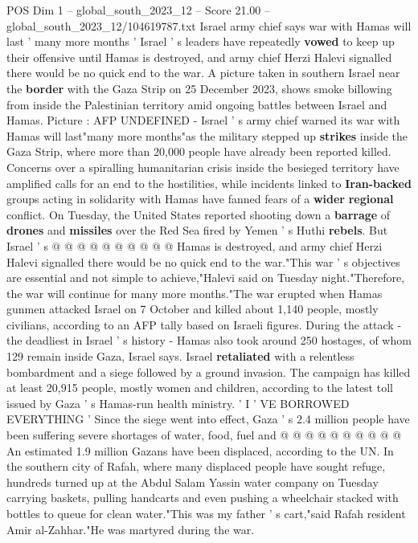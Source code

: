 \begin{textsample}{POS Dim 1 – global\_south\_2023\_12 – Score 21.00 – global\_south\_2023\_12/104619787.txt}  \label{ex:f1_pos_162}
Israel army chief says war with Hamas will last ' many more months ' Israel ' s leaders have repeatedly \textbf{vowed} to keep up their offensive until Hamas is destroyed, and army chief Herzi Halevi signalled there would be no quick end to the war.
A picture taken in southern Israel near the \textbf{border} with the Gaza Strip on 25 December 2023, shows smoke billowing from inside the Palestinian territory amid ongoing battles between Israel and Hamas.
Picture : AFP UNDEFINED - Israel ' s army chief warned its war with Hamas will last"many more months"as the military stepped up \textbf{strikes} inside the Gaza Strip, where more than 20,000 people have already been reported killed.
Concerns over a spiralling humanitarian crisis inside the besieged territory have amplified calls for an end to the hostilities, while incidents linked to \textbf{Iran-backed} groups acting in solidarity with Hamas have fanned fears of a \textbf{wider} \textbf{regional} conflict.
On Tuesday, the United States reported shooting down a \textbf{barrage} of \textbf{drones} and \textbf{missiles} over the Red Sea fired by Yemen ' s Huthi \textbf{rebels}.
But Israel ' s @ @ @ @ @ @ @ @ @ @ Hamas is destroyed, and army chief Herzi Halevi signalled there would be no quick end to the war."This war ' s objectives are essential and not simple to achieve,"Halevi said on Tuesday night."Therefore, the war will continue for many more months."The war erupted when Hamas gunmen attacked Israel on 7 October and killed about 1,140 people, mostly civilians, according to an AFP tally based on Israeli figures.
During the attack - the deadliest in Israel ' s history - Hamas also took around 250 hostages, of whom 129 remain inside Gaza, Israel says.
Israel \textbf{retaliated} with a relentless bombardment and a siege followed by a ground invasion.
The campaign has killed at least 20,915 people, mostly women and children, according to the latest toll issued by Gaza ' s Hamas-run health ministry. ' I ' VE BORROWED EVERYTHING ' Since the siege went into effect, Gaza ' s 2.4 million people have been suffering severe shortages of water, food, fuel and @ @ @ @ @ @ @ @ @ @ An estimated 1.9 million Gazans have been displaced, according to the UN.
In the southern city of Rafah, where many displaced people have sought refuge, hundreds turned up at the Abdul Salam Yassin water company on Tuesday carrying baskets, pulling handcarts and even pushing a wheelchair stacked with bottles to queue for clean water."This was my father ' s cart,"said Rafah resident Amir al-Zahhar."He was martyred during the war.

\end{textsample}
